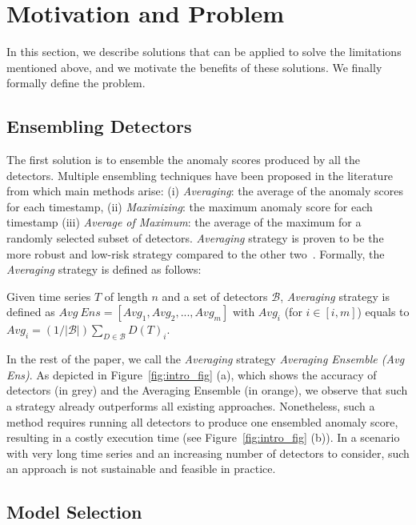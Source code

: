 \section{Motivation and Problem}
\label{sec:problem_def}

In this section, we describe solutions that can be applied to solve the limitations mentioned above, and we motivate the benefits of these solutions. We finally formally define the problem.

\subsection{Ensembling Detectors}

The first solution is to ensemble the anomaly scores produced by all the detectors. Multiple ensembling techniques have been proposed in the literature~\cite{10.1145/2830544.2830549} from which  main methods arise: (i) \textit{Averaging}: the average of the anomaly scores for each timestamp, (ii) \textit{Maximizing}: the maximum anomaly score for each timestamp (iii) \textit{Average of Maximum}: the average of the maximum for a randomly selected subset of detectors. \textit{Averaging} strategy is proven to be the more robust and low-risk strategy compared to the other two~\cite{10.1145/2830544.2830549}. Formally, the \textit{Averaging} strategy is defined as follows:

\begin{definition}
    Given time series $T$ of length $n$ and a set of detectors $\mathcal{B}$, \textit{Averaging} strategy is defined as $Avg~Ens = [Avg_1,Avg_2, ..., Avg_m]$ with $Avg_i$ (for $i \in [i,m]$) equals to $Avg_i= (1/|\mathcal{B}|)\sum_{D \in \mathcal{B}} D(T)_i$.
\end{definition}


In the rest of the paper, we call the \textit{Averaging} strategy \textit{Averaging Ensemble (Avg Ens)}. As depicted in Figure~\ref{fig:intro_fig} (a), which shows the accuracy of detectors (in grey) and the Averaging Ensemble (in orange), we observe that such a strategy already outperforms all existing approaches. Nonetheless, such a method requires running all detectors to produce one ensembled anomaly score, resulting in a costly execution time (see Figure~\ref{fig:intro_fig} (b)). In a scenario with very long time series and an increasing number of detectors to consider, such an approach is not sustainable and feasible in practice.

\subsection{Model Selection}

